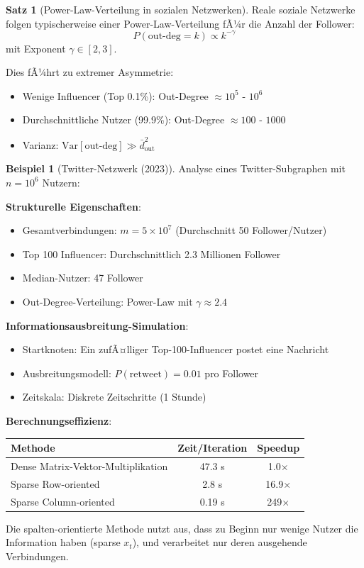 ﻿\documentclass[a4paper,12pt]{report}
\theoremstyle{definition}
\newtheorem{beispiel}{Beispiel}
\newtheorem{satz}{Satz}
\begin{document}
	\begin{satz}[Power-Law-Verteilung in sozialen Netzwerken]
		Reale soziale Netzwerke folgen typischerweise einer Power-Law-Verteilung fÃ¼r die Anzahl der Follower:
		\[
		P(\text{out-deg} = k) \propto k^{-\gamma}
		\]
		mit Exponent $\gamma \in [2, 3]$.
		
		Dies fÃ¼hrt zu extremer Asymmetrie:
		\begin{itemize}
			\item Wenige Influencer (Top 0.1\%): Out-Degree $\approx 10^5$ - $10^6$
			\item Durchschnittliche Nutzer (99.9\%): Out-Degree $\approx 100$ - $1000$
			\item Varianz: $\text{Var}[\text{out-deg}] \gg \bar{d}_{\text{out}}^2$
		\end{itemize}
	\end{satz}
	
	\begin{beispiel}[Twitter-Netzwerk (2023)]
		Analyse eines Twitter-Subgraphen mit $n = 10^6$ Nutzern:
		
		\textbf{Strukturelle Eigenschaften}:
		\begin{itemize}
			\item Gesamtverbindungen: $m = 5 \times 10^7$ (Durchschnitt 50 Follower/Nutzer)
			\item Top 100 Influencer: Durchschnittlich 2.3 Millionen Follower
			\item Median-Nutzer: 47 Follower
			\item Out-Degree-Verteilung: Power-Law mit $\gamma \approx 2.4$
		\end{itemize}
		
		\textbf{Informationsausbreitung-Simulation}:
		\begin{itemize}
			\item Startknoten: Ein zufÃ¤lliger Top-100-Influencer postet eine Nachricht
			\item Ausbreitungsmodell: $P(\text{retweet}) = 0.01$ pro Follower
			\item Zeitskala: Diskrete Zeitschritte (1 Stunde)
		\end{itemize}
		
		\textbf{Berechnungseffizienz}:
		\begin{center}
			\begin{tabular}{|l|c|c|}
				\hline
				\textbf{Methode} & \textbf{Zeit/Iteration} & \textbf{Speedup} \\
				\hline
				Dense Matrix-Vektor-Multiplikation & 47.3 s & 1.0$\times$ \\
				Sparse Row-oriented & 2.8 s & 16.9$\times$ \\
				Sparse Column-oriented & 0.19 s & 249$\times$ \\
				\hline
			\end{tabular}
		\end{center}
		
		Die spalten-orientierte Methode nutzt aus, dass zu Beginn nur wenige Nutzer die Information haben (sparse $x_t$), und verarbeitet nur deren ausgehende Verbindungen.
	\end{beispiel}
	
\end{document}
